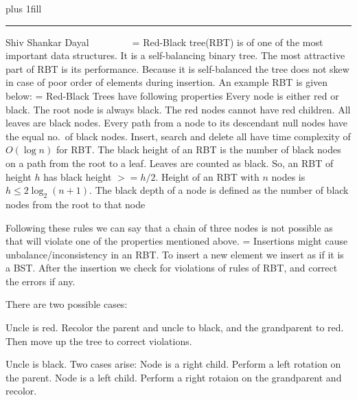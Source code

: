 

\begingroup
  \nopagenumbers
  \topglue 0pt plus 1fill
  \vskip 5mm
  \hrule
  \vskip 5mm
  \noindent\authorfont Shiv Shankar Dayal
  ~~~~
  \vfill
  \break
\endgroup
~~~
\headline=\header
{}
\vskip 1cm
\textfont\baselineskip16pt Red-Black tree(RBT) is of one of the most important data structures. It is a
self-balancing binary tree. The most attractive part of RBT is its performance. Because it is self-balanced
the tree does not skew in case of poor order of elements during insertion. An example RBT is given below:
\vskip 5mm
\eject
\headline=\header
{}
\vskip 1cm
\textfont\baselineskip16pt
Red-Black Trees have following properties
\numberedlist
\li Every node is either red or black.
\li The root node is always black.
\li The red nodes cannot have red children.
\li All leaves are black nodes.
\li Every path from a node to its descendant null nodes have the equal no.\ of black nodes.
\li Insert, search and delete all have time complexity of $O(\log n)$ for RBT.
\li The black height of an RBT is the number of black nodes on a path from the root to a leaf. Leaves are
    counted as black. So, an RBT of height $h$ has black height $>= h/2$.
\li Height of an RBT with $n$ nodes is $h\leq 2 \log_2(n + 1)$.
\li The black depth of a node is defined as the number of black nodes from the root to that node
\endnumberedlist

Following these rules we can say that a chain of three nodes is not possible as that will violate one of
the properties mentioned above.
\vfill
\eject
\headline=\header
{}
\vskip 1cm
\textfont\baselineskip16pt
Insertions might cause unbalance/inconsistency in an RBT. To insert a new element we insert as if it is a
BST. After the insertion we check for violations of rules of RBT, and correct the errors if any.

There are two possible cases:

\numberedlist
\li Uncle is red. Recolor the parent and uncle to black, and the grandparent to red. Then move up
    the tree to correct violations.

\li Uncle is black. Two cases arise:
    \numberedlist
        \li Node is a right child. Perform a left rotation on the parent.
        \li Node is a left child. Perform a right rotaion on the grandparent and recolor.
    \endnumberedlist
\endnumberedlist
\vfill
\eject

